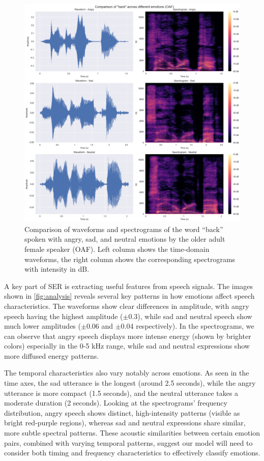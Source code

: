 \documentclass[../main.tex]{subfiles}
\begin{document}
\begin{figure}[h]
    \centering
    \includegraphics[width= 350pt]{../resources/tess_analysis.png}
    \caption{Comparison of waveforms and spectrograms of the word 
    ``back'' spoken with angry, sad, and neutral emotions by the older adult 
    female speaker (OAF). Left column shows the time-domain waveforms, the 
    right column shows the corresponding spectrograms with intensity in dB.}
    \label{fig:analysis}
\end{figure}

A key part of SER is extracting useful features from speech signals. The images shown 
in \autoref{fig:analysis} reveals several key patterns in how emotions 
affect speech characteristics. The waveforms show clear differences in amplitude, with
angry speech having the highest amplitude ($\pm$0.3), while sad and neutral speech
show much lower amplitudes ($\pm$0.06 and $\pm$0.04 respectively). In the spectrograms,
we can observe that angry speech displays more intense energy
(shown by brighter colors) especially in the 0-5 kHz range, while sad and
neutral expressions show more diffused energy patterns.

The temporal characteristics also vary notably across emotions. As seen in the
time axes, the sad utterance is the longest (around 2.5 seconds), while the
angry utterance is more compact (1.5 seconds), and the neutral utterance takes
a moderate duration (2 seconds). Looking at the spectrograms' frequency
distribution, angry speech shows distinct, high-intensity patterns
(visible as bright red-purple regions), whereas sad and neutral expressions
share similar, more subtle spectral patterns. These acoustic similarities
between certain emotion pairs, combined with varying temporal patterns,
suggest our model will need to consider both timing and frequency
characteristics to effectively classify emotions.
\end{document}

